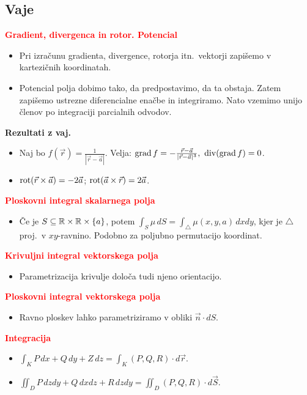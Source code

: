 \documentclass[a4paper,oneside,8pt,landscape]{extarticle}
\begin{document}
\begin{multicols*}{3}
\subsection*{Vaje}
\textbf{\textcolor{red}{Gradient, divergenca in rotor. Potencial}}
\begin{itemize}
    \item Pri izračunu gradienta, divergence, rotorja itn.\ vektorji zapišemo v kartezičnih koordinatah.
    \item Potencial polja dobimo tako, da predpostavimo, da ta obstaja. Zatem zapišemo ustrezne diferencialne enačbe in integriramo. Nato vzemimo unijo členov po integraciji parcialnih odvodov.
\end{itemize}
%
\textbf{Rezultati z vaj.}
\begin{itemize}
    \item Naj bo \(f(\vec{r}) = \frac{1}{|\vec{r} - \vec{a}|}\). Velja: \(
        \operatorname{grad} f = - \frac{\vec{r} - \vec{a}}{|\vec{r} - \vec{a}|^3},\ \operatorname{div} (\operatorname{grad} f) = 0\).
    \item \(\operatorname{rot} (\vec{r} \times \vec{a}) = - 2 \vec{a}\); \(\operatorname{rot} (\vec{a} \times \vec{r}) = 2 \vec{a}\).
\end{itemize}
%
%
\textbf{\textcolor{red}{Ploskovni integral skalarnega polja}}
\begin{itemize}
    \item Če je \(S \subseteq \mathbb{R} \times \mathbb{R} \times \{a\}\), potem \(\int_{S} \mu \, dS = \int_{\triangle} \mu(x,y,a) \, dxdy\), kjer je \(\triangle\) proj.\ v \(xy\)-ravnino. Podobno za poljubno permutacijo koordinat.
\end{itemize}
%
%
\textbf{\textcolor{red}{Krivuljni integral vektorskega polja}}
\begin{itemize}
    \item Parametrizacija krivulje določa tudi njeno orientacijo.
\end{itemize}
%
%
\textbf{\textcolor{red}{Ploskovni integral vektorskega polja}}
\begin{itemize}
    \item Ravno ploskev lahko parametriziramo v obliki \(\vec{n} \cdot dS\).
\end{itemize}
%
%
\textbf{\textcolor{red}{Integracija}}
\begin{itemize}    
    \item \(\int_{K} P\, dx + Q\, dy + Z\, dz = \int_K (P, Q, R) \cdot d\vec{r}\).
    \item \(\iint_D P\, dzdy + Q\, dxdz + R\, dzdy = \iint_D (P, Q, R) \cdot d \vec{S}\).

\end{itemize}
\end{multicols*}
\end{document}
